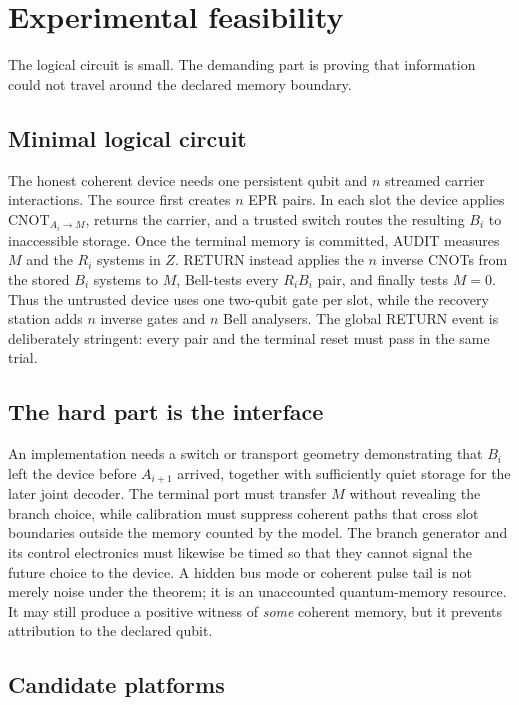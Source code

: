 \section{Experimental feasibility}
\label{sec:feasibility}

The logical circuit is small. The demanding part is proving that information could not travel around the declared memory boundary.

\subsection{Minimal logical circuit}

The honest coherent device needs one persistent qubit and $n$ streamed carrier interactions. The source first creates $n$ EPR pairs. In each slot the device applies $\mathrm{CNOT}_{A_i\rightarrow M}$, returns the carrier, and a trusted switch routes the resulting $B_i$ to inaccessible storage. Once the terminal memory is committed, AUDIT measures $M$ and the $R_i$ systems in $Z$. RETURN instead applies the $n$ inverse CNOTs from the stored $B_i$ systems to $M$, Bell-tests every $R_iB_i$ pair, and finally tests $M=0$. Thus the untrusted device uses one two-qubit gate per slot, while the recovery station adds $n$ inverse gates and $n$ Bell analysers. The global RETURN event is deliberately stringent: every pair and the terminal reset must pass in the same trial.

\subsection{The hard part is the interface}

An implementation needs a switch or transport geometry demonstrating that $B_i$ left the device before $A_{i+1}$ arrived, together with sufficiently quiet storage for the later joint decoder. The terminal port must transfer $M$ without revealing the branch choice, while calibration must suppress coherent paths that cross slot boundaries outside the memory counted by the model. The branch generator and its control electronics must likewise be timed so that they cannot signal the future choice to the device. A hidden bus mode or coherent pulse tail is not merely noise under the theorem; it is an unaccounted quantum-memory resource. It may still produce a positive witness of \emph{some} coherent memory, but it prevents attribution to the declared qubit.

\subsection{Candidate platforms}

